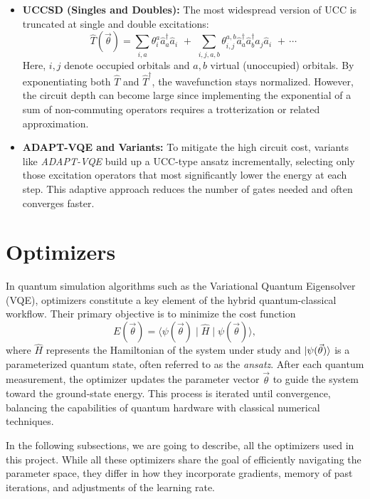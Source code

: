 \begin{itemize}
    \item \textbf{UCCSD (Singles and Doubles):} The most widespread version of UCC is truncated at single and double excitations:
    \[
        \hat{T}(\vec{\theta}) = \sum_{i,a} \theta_{i}^{a} \hat{a}_a^\dagger \hat{a}_i 
          \,\,+\,\, 
          \sum_{i,j,a,b} \theta_{i,j}^{a,b} \hat{a}_a^\dagger \hat{a}_b^\dagger \hat{a}_j \hat{a}_i
          \,\,+\, \cdots
    \]
    Here, $i, j$ denote occupied orbitals and $a, b$ virtual (unoccupied) orbitals. By exponentiating both $\hat{T}$ and $\hat{T}^\dagger$, the wavefunction stays normalized. However, the circuit depth can become large since implementing the exponential of a sum of non-commuting operators requires a trotterization or related approximation.

    \item \textbf{ADAPT-VQE and Variants:} To mitigate the high circuit cost, variants like \textit{ADAPT-VQE} build up a UCC-type ansatz incrementally, selecting only those excitation operators that most significantly lower the energy at each step. This adaptive approach reduces the number of gates needed and often converges faster.
\end{itemize}

\section{Optimizers}
\label{sec:optimizers}

In quantum simulation algorithms such as the Variational Quantum Eigensolver (VQE), optimizers constitute a key element of the hybrid quantum-classical workflow. Their primary objective is to minimize the cost function
\[
E(\vec{\theta}) = \langle \psi(\vec{\theta}) \mid \hat{H} \mid \psi(\vec{\theta}) \rangle,
\]
where \(\hat{H}\) represents the Hamiltonian of the system under study and \(\ket{\psi(\vec{\theta})}\) is a parameterized quantum state, often referred to as the \emph{ansatz}. After each quantum measurement, the optimizer updates the parameter vector \(\vec{\theta}\) to guide the system toward the ground-state energy. This process is iterated until convergence, balancing the capabilities of quantum hardware with classical numerical techniques.

In the following subsections, we are going to describe, all the optimizers used in this project. While all these optimizers share the goal of efficiently navigating the parameter space, they differ in how they incorporate gradients, memory of past iterations, and adjustments of the learning rate.\cite{OptimizationAlgorithms} 

